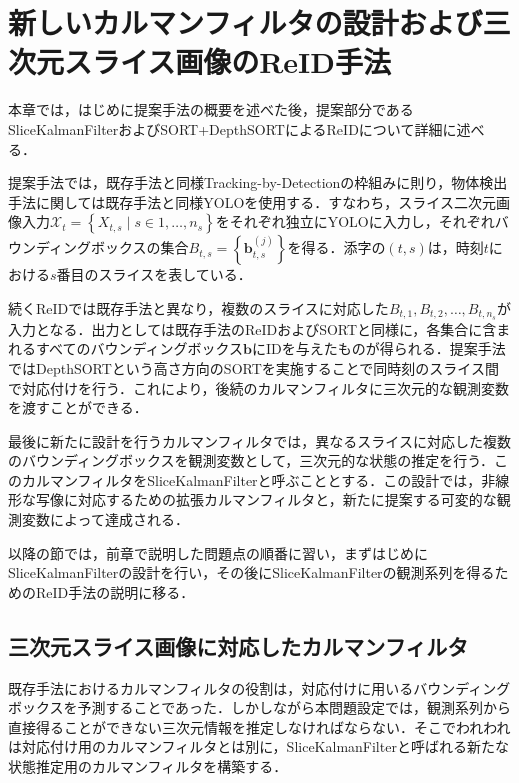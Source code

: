 \section{新しいカルマンフィルタの設計および三次元スライス画像のReID手法}
\label{sec:proposed_method}

    本章では，はじめに提案手法の概要を述べた後，提案部分であるSliceKalmanFilterおよびSORT+DepthSORTによるReIDについて詳細に述べる．

    提案手法では，既存手法と同様Tracking-by-Detectionの枠組みに則り，物体検出手法に関しては既存手法と同様YOLOを使用する．すなわち，スライス二次元画像入力$\mathcal{X}_t = \left\{X_{t, s} \mid s \in {1, \dots, n_s}\right\}$をそれぞれ独立にYOLOに入力し，それぞれバウンディングボックスの集合$B_{t,s} = \left\{\bm{b}_{t,s}^{(j)}\right\}$を得る．添字の$(t,s)$は，時刻$t$における$s$番目のスライスを表している．

    続くReIDでは既存手法と異なり，複数のスライスに対応した$B_{t,1}, B_{t,2}, \dots, B_{t,n_s}$が入力となる．出力としては既存手法のReIDおよびSORTと同様に，各集合に含まれるすべてのバウンディングボックス$\bm{b}$にIDを与えたものが得られる．提案手法ではDepthSORTという高さ方向のSORTを実施することで同時刻のスライス間で対応付けを行う．これにより，後続のカルマンフィルタに三次元的な観測変数を渡すことができる．

    最後に新たに設計を行うカルマンフィルタでは，異なるスライスに対応した複数のバウンディングボックスを観測変数として，三次元的な状態の推定を行う．このカルマンフィルタをSliceKalmanFilterと呼ぶこととする．この設計では，非線形な写像に対応するための拡張カルマンフィルタと，新たに提案する可変的な観測変数によって達成される．

    以降の節では，前章で説明した問題点の順番に習い，まずはじめにSliceKalmanFilterの設計を行い，その後にSliceKalmanFilterの観測系列を得るためのReID手法の説明に移る．


    \subsection{三次元スライス画像に対応したカルマンフィルタ}
    \label{subsec:sliced_kalman_filter}
    
    既存手法におけるカルマンフィルタの役割は，対応付けに用いるバウンディングボックスを予測することであった．しかしながら本問題設定では，観測系列から直接得ることができない三次元情報を推定しなければならない．そこでわれわれは対応付け用のカルマンフィルタとは別に，SliceKalmanFilterと呼ばれる新たな状態推定用のカルマンフィルタを構築する．
    
